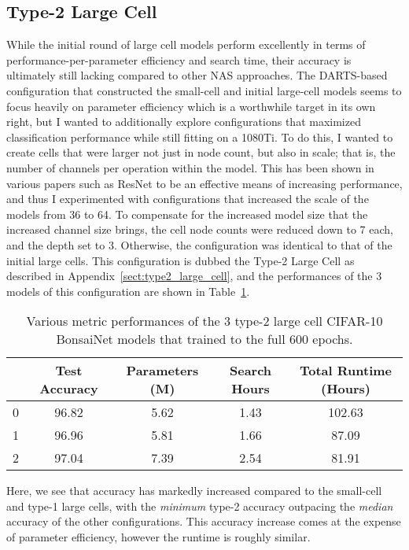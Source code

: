 \subsection{Type-2 Large Cell}
While the initial round of large cell models perform excellently in terms of performance-per-parameter efficiency and search time,
their accuracy is ultimately still lacking compared to other NAS approaches. The DARTS-based configuration that
constructed the small-cell and initial large-cell models seems to focus heavily on parameter efficiency which is a worthwhile
target in its own right, but I wanted to additionally explore configurations that maximized classification performance while
still fitting on a 1080Ti. To do this, I wanted to create cells that were larger not just in node count, but also in scale;
that is, the number of channels per operation within the model. This has been shown in various papers such as ResNet\cite{szegedy2014}
to be an effective means of increasing performance, and thus I experimented with configurations that increased the scale of the models
from 36 to 64. To compensate for the increased model size that the increased channel size brings, the cell node counts were
reduced down to 7 each, and the depth set to 3. Otherwise, the configuration was identical to that of the initial large
cells. This configuration is dubbed the Type-2 Large Cell as described in Appendix~\ref{sect:type2_large_cell},
and the performances of the 3 models of this configuration are shown in Table~\ref{tab:large_cell_metrics}.

\begin{table}[h]
\begin{center}
	\begin{tabular}{r|c|c|c|c}
	 & Test Accuracy & Parameters (M) & Search Hours & Total Runtime (Hours) \\
	\hline
	0    & 96.82 & 5.62 & 1.43 & 102.63 \\
	1	 & 96.96 & 5.81 & 1.66 & 87.09\\
	2    & 97.04 & 7.39 & 2.54 & 81.91\\
	\end{tabular}
\end{center}
\caption{Various metric performances of the 3 type-2 large cell CIFAR-10 BonsaiNet models that trained to the full 600 epochs.}
\label{tab:large_cell_metrics}
\end{table}

Here, we see that accuracy has markedly increased compared to the small-cell and type-1 large cells, with the \textit{minimum}
type-2 accuracy outpacing the \textit{median} accuracy of the other configurations. This accuracy increase comes at the
expense of parameter efficiency, however the runtime is roughly similar.


